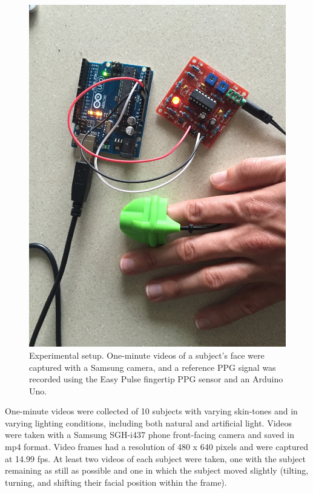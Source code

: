 \documentclass[10pt,twocolumn,letterpaper]{article}
\begin{document}
\begin{figure}
\begin{center}
	\includegraphics[scale=0.045]{figures/ref_setup}
\end{center}
\caption{Experimental setup. One-minute videos of a subject's face were captured with a Samsung camera, and a reference PPG signal was recorded using the Easy Pulse fingertip PPG sensor and an Arduino Uno.}
\label{setup}
\end{figure}

One-minute videos were collected of 10 subjects with varying skin-tones and in varying lighting conditions, including both natural and artificial light. Videos were taken with a Samsung SGH-i437 phone front-facing camera and saved in mp4 format. Video frames had a resolution of 480 x 640 pixels and were captured at 14.99 fps. At least two videos of each subject were taken, one with the subject remaining as still as possible and one in which the subject moved slightly (tilting, turning, and shifting their facial position within the frame). 
\end{document}
